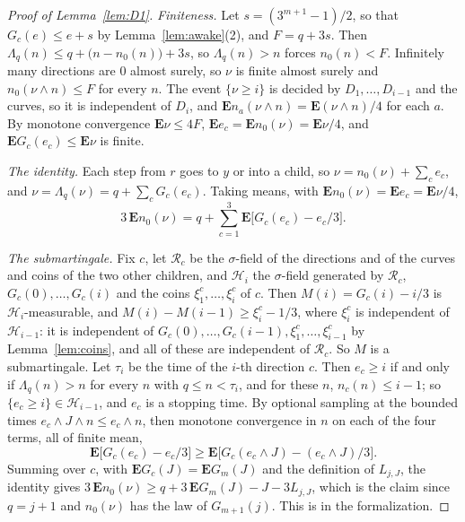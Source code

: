 \documentclass[11pt]{amsart}
\theoremstyle{definition}
\numberwithin{equation}{section}
\newcommand{\E}{\mathbf{E}}
\begin{document}
\begin{proof}[Proof of Lemma~\ref{lem:D1}]
\emph{Finiteness.} Let $s=(3^{m+1}-1)/2$, so that $G_c(e)\le e+s$ by Lemma~\ref{lem:awake}(2), and $F=q+3s$. Then $\Lambda_q(n)\le q+\bigl(n-n_0(n)\bigr)+3s$, so $\Lambda_q(n)>n$ forces $n_0(n)<F$. Infinitely many directions are $0$ almost surely, so $\nu$ is finite almost surely and $n_0(\nu\wedge n)\le F$ for every $n$. The event $\{\nu\ge i\}$ is decided by $D_1,\dots,D_{i-1}$ and the curves, so it is independent of $D_i$, and $\E n_a(\nu\wedge n)=\E(\nu\wedge n)/4$ for each $a$. By monotone convergence $\E\nu\le4F$, $\E e_c=\E n_0(\nu)=\E\nu/4$, and $\E G_c(e_c)\le\E\nu$ is finite.

\emph{The identity.} Each step from $r$ goes to $y$ or into a child, so $\nu=n_0(\nu)+\sum_ce_c$, and $\nu=\Lambda_q(\nu)=q+\sum_cG_c(e_c)$. Taking means, with $\E n_0(\nu)=\E e_c=\E\nu/4$,
\[
3\,\E n_0(\nu)=q+\sum_{c=1}^3\E\bigl[G_c(e_c)-e_c/3\bigr].
\]

\emph{The submartingale.} Fix $c$, let $\mathcal R_c$ be the $\sigma$-field of the directions and of the curves and coins of the two other children, and $\mathcal H_i$ the $\sigma$-field generated by $\mathcal R_c$, $G_c(0),\dots,G_c(i)$ and the coins $\xi^c_1,\dots,\xi^c_i$ of $c$. Then $M(i)=G_c(i)-i/3$ is $\mathcal H_i$-measurable, and $M(i)-M(i-1)\ge\xi^c_i-1/3$, where $\xi^c_i$ is independent of $\mathcal H_{i-1}$: it is independent of $G_c(0),\dots,G_c(i-1),\xi^c_1,\dots,\xi^c_{i-1}$ by Lemma~\ref{lem:coins}, and all of these are independent of $\mathcal R_c$. So $M$ is a submartingale. Let $\tau_i$ be the time of the $i$-th direction $c$. Then $e_c\ge i$ if and only if $\Lambda_q(n)>n$ for every $n$ with $q\le n<\tau_i$, and for these $n$, $n_c(n)\le i-1$; so $\{e_c\ge i\}\in\mathcal H_{i-1}$, and $e_c$ is a stopping time. By optional sampling at the bounded times $e_c\wedge J\wedge n\le e_c\wedge n$, then monotone convergence in $n$ on each of the four terms, all of finite mean,
\[
\E\bigl[G_c(e_c)-e_c/3\bigr]\ge\E\bigl[G_c(e_c\wedge J)-(e_c\wedge J)/3\bigr].
\]
Summing over $c$, with $\E G_c(J)=\E G_m(J)$ and the definition of $L_{j,J}$, the identity gives $3\,\E n_0(\nu)\ge q+3\,\E G_m(J)-J-3L_{j,J}$, which is the claim since $q=j+1$ and $n_0(\nu)$ has the law of $G_{m+1}(j)$. This is  in the formalization.
\end{proof}
\end{document}
